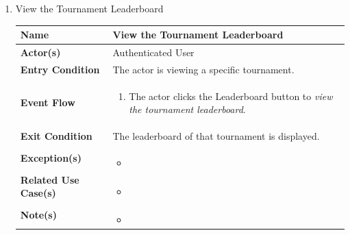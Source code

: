 \begin{enumerate}
\item View the Tournament Leaderboard
\begin{center}
    \begin{tabular}{ | m{10em} | m{10cm}| } 
      \hline
      \textbf{Name} & View the Tournament Leaderboard \\ 
      \hline
      \textbf{Actor(s)} & Authenticated User \\ 
      \hline
      \textbf{Entry Condition} & The actor is viewing a specific tournament. \\ 
      \hline
      \textbf{Event Flow} & 
          \begin{enumerate}[(1)]
              \item The actor clicks the Leaderboard button to \textit{view the tournament leaderboard}.
          \end{enumerate}
      \\ 
      \hline
      \textbf{Exit Condition} & The leaderboard of that tournament is displayed.  \\ 
      \hline
      \textbf{Exception(s)} & 
      \begin{itemize}
          \item 
      \end{itemize}
          \\ 
      \hline
      \textbf{Related Use Case(s)} & 
      \begin{itemize}
          \item 
      \end{itemize}
          \\ 
      \hline
      \textbf{Note(s)} & 
      \begin{itemize}
          \item 
      \end{itemize}
          \\ 
      \hline
    \end{tabular}
\end{center}



\end{enumerate}
